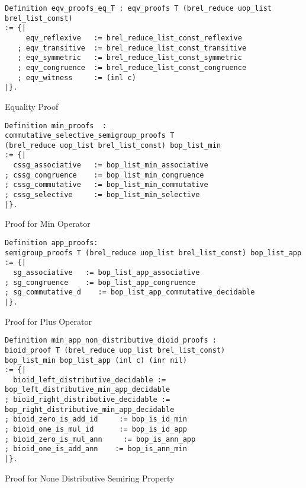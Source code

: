 \begin{listing}[H]
\begin{verbatim}
Definition eqv_proofs_eq_T : eqv_proofs T (brel_reduce uop_list brel_list_const)
:= {| 
     eqv_reflexive   := brel_reduce_list_const_reflexive
   ; eqv_transitive  := brel_reduce_list_const_transitive
   ; eqv_symmetric   := brel_reduce_list_const_symmetric
   ; eqv_congruence  := brel_reduce_list_const_congruence
   ; eqv_witness     := (inl c)
|}.  
\end{verbatim}
\caption{Equality Proof} 
\label{coq:proof:eqv_proofs_eq_T}
\end{listing}
\begin{listing}[H]
\begin{verbatim}
Definition min_proofs  : 
commutative_selective_semigroup_proofs T 
(brel_reduce uop_list brel_list_const) bop_list_min
:= {|
  cssg_associative   := bop_list_min_associative
; cssg_congruence    := bop_list_min_congruence
; cssg_commutative   := bop_list_min_commutative
; cssg_selective     := bop_list_min_selective                                        
|}.
\end{verbatim}
\caption{Proof for Min Operator} 
\label{coq:def:min_proofs}
\end{listing}
\begin{listing}[H]
\begin{verbatim}
Definition app_proofs: 
semigroup_proofs T (brel_reduce uop_list brel_list_const) bop_list_app
:= {|
  sg_associative   := bop_list_app_associative
; sg_congruence    := bop_list_app_congruence
; sg_commutative_d    := bop_list_app_commutative_decidable                                                
|}.
\end{verbatim}
\caption{Proof for Plus Operator} 
\label{coq:def:app_proofs}
\end{listing}
\begin{listing}[H]
\begin{verbatim}
Definition min_app_non_distributive_dioid_proofs : 
bioid_proof T (brel_reduce uop_list brel_list_const) 
bop_list_min bop_list_app (inl c) (inr nil)
:= {|  
  bioid_left_distributive_decidable := bop_left_distributive_min_app_decidable
; bioid_right_distributive_decidable := bop_right_distributive_min_app_decidable
; bioid_zero_is_add_id     := bop_is_id_min
; bioid_one_is_mul_id      := bop_is_id_app 
; bioid_zero_is_mul_ann     := bop_is_ann_app
; bioid_one_is_add_ann    := bop_is_ann_min
|}.
\end{verbatim}
\caption{Proof for None Distributive Semiring Property} 
\label{coq:def:min_app_non_distributive_dioid_proofs}
\end{listing}

